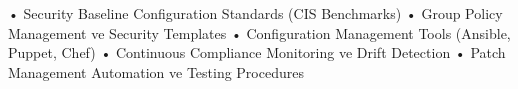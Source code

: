 • Security Baseline Configuration Standards (CIS Benchmarks)
• Group Policy Management ve Security Templates
• Configuration Management Tools (Ansible, Puppet, Chef)
• Continuous Compliance Monitoring ve Drift Detection
• Patch Management Automation ve Testing Procedures
